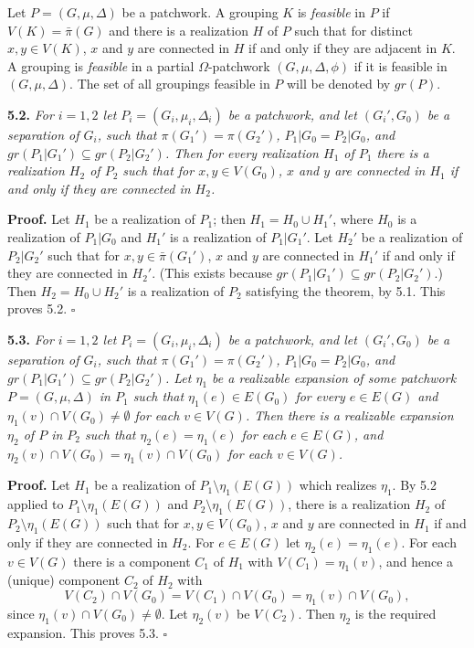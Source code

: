 Let $P = (G, \mu, \Delta)$ be a patchwork. A grouping $K$ is \textit{feasible} in $P$ if $V(K) = \bar{\pi}(G)$ and there is a realization $H$ of $P$ such that for distinct $x, y \in V(K)$, $x$ and $y$ are connected in $H$ if and only if they are adjacent in $K$. A grouping is \textit{feasible} in a partial $\Omega$-patchwork $(G, \mu, \Delta, \phi)$ if it is feasible in $(G, \mu, \Delta)$. The set of all groupings feasible in $P$ will be denoted by $gr(P)$.

\textbf{5.2.} \textit{For $i = 1, 2$ let $P_i = (G_i, \mu_i, \Delta_i)$ be a patchwork, and let $(G_i', G_0)$ be a separation of $G_i$, such that $\pi(G_1') = \pi(G_2')$, $P_1|G_0 = P_2|G_0$, and $gr(P_1|G_1') \subseteq gr(P_2|G_2')$. Then for every realization $H_1$ of $P_1$ there is a realization $H_2$ of $P_2$ such that for $x, y \in V(G_0)$, $x$ and $y$ are connected in $H_1$ if and only if they are connected in $H_2$.}

\textbf{Proof.} Let $H_1$ be a realization of $P_1$; then $H_1 = H_0 \cup H_1'$, where $H_0$ is a realization of $P_1|G_0$ and $H_1'$ is a realization of $P_1|G_1'$. Let $H_2'$ be a realization of $P_2|G_2'$ such that for $x, y \in \bar{\pi}(G_1')$, $x$ and $y$ are connected in $H_1'$ if and only if they are connected in $H_2'$. (This exists because $gr(P_1|G_1') \subseteq gr(P_2|G_2')$.) Then $H_2 = H_0 \cup H_2'$ is a realization of $P_2$ satisfying the theorem, by 5.1. This proves 5.2. $\square$

\textbf{5.3.} \textit{For $i = 1, 2$ let $P_i = (G_i, \mu_i, \Delta_i)$ be a patchwork, and let $(G_i', G_0)$ be a separation of $G_i$, such that $\pi(G_1') = \pi(G_2')$, $P_1|G_0 = P_2|G_0$, and $gr(P_1|G_1') \subseteq gr(P_2|G_2')$. Let $\eta_1$ be a realizable expansion of some patchwork $P = (G, \mu, \Delta)$ in $P_1$ such that $\eta_1(e) \in E(G_0)$ for every $e \in E(G)$ and $\eta_1(v) \cap V(G_0) \ne \emptyset$ for each $v \in V(G)$. Then there is a realizable expansion $\eta_2$ of $P$ in $P_2$ such that $\eta_2(e) = \eta_1(e)$ for each $e \in E(G)$, and $\eta_2(v) \cap V(G_0) = \eta_1(v) \cap V(G_0)$ for each $v \in V(G)$.}

\textbf{Proof.} Let $H_1$ be a realization of $P_1 \setminus \eta_1(E(G))$ which realizes $\eta_1$. By 5.2 applied to $P_1 \setminus \eta_1(E(G))$ and $P_2 \setminus \eta_1(E(G))$, there is a realization $H_2$ of $P_2 \setminus \eta_1(E(G))$ such that for $x, y \in V(G_0)$, $x$ and $y$ are connected in $H_1$ if and only if they are connected in $H_2$. For $e \in E(G)$ let $\eta_2(e) = \eta_1(e)$. For each $v \in V(G)$ there is a component $C_1$ of $H_1$ with $V(C_1) = \eta_1(v)$, and hence a (unique) component $C_2$ of $H_2$ with
\begin{equation*}
V(C_2) \cap V(G_0) = V(C_1) \cap V(G_0) = \eta_1(v) \cap V(G_0),
\end{equation*}
since $\eta_1(v) \cap V(G_0) \ne \emptyset$. Let $\eta_2(v)$ be $V(C_2)$. Then $\eta_2$ is the required expansion. This proves 5.3. $\square$


